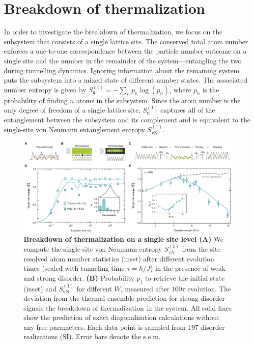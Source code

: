 \section{Breakdown of thermalization}

In order to investigate the breakdown of thermalization, we focus on the subsystem that consists of a single lattice site. The conserved total atom number enforces a one-to-one correspondence between the particle number outcome on a single site and the number in the remainder of the system---entangling the two during tunnelling dynamics. Ignoring information about the remaining system puts the subsystem into a mixed state of different number states. The associated number entropy is given by $S_\text{n}^{(1)} = -\sum_{n} p_n \log(p_n)$, where $p_n$ is the probability of finding $n$ atoms in the subsystem. Since the atom number is the only degree of freedom of a single lattice site, $S_\text{n}^{(1)}$ captures all of the entanglement between the subsystem and its complement and is equivalent to the single-site von Neumann entanglement entropy $S_\text{vN}^{(1)}$.

\begin{figure}[t]
	\centering
	\includegraphics[width=\textwidth]{figures/MBL_ETH_breakdown.pdf}
	{\caption{{\bf Breakdown of thermalization on a single site level (A)} We compute the single-site von Neumann entropy $S_\text{vN}^{(1)}$ from the site-resolved atom number statistics (inset) after different evolution times (scaled with tunneling time $\tau=\hbar/J$) in the presence of weak and strong disorder. {\bf(B)} Probability $p_1$ to retrieve the initial state (inset) and $S_\text{vN}^{(1)}$ for different $W$, measured after $100\tau$ evolution. The deviation from the thermal ensemble prediction for strong disorder signals the breakdown of thermalization in the system. All solid lines show the prediction of exact diagonalization calculations without any free parameters. Each data point is sampled from 197 disorder realizations (SI). Error bars denote the s.e.m.}
	\label{fig:MBL_ETH_breakdown}}
\end{figure}

